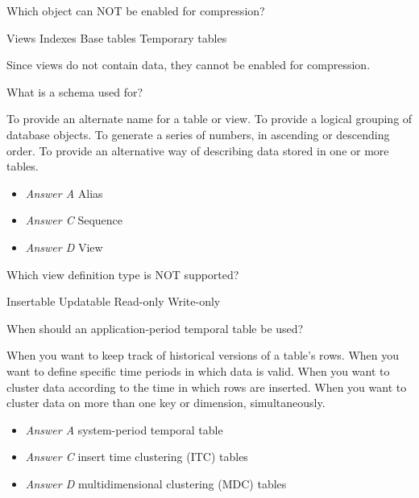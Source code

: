 \documentclass[answers, 11pt]{exam}
\begin{document}
\begin{questions}
\question[1]
Which object can NOT be enabled for compression?
\begin{choices}
	\CorrectChoice Views
	\choice Indexes
	\choice Base tables
	\choice Temporary tables
\end{choices}

\begin{solution}
	Since views do not contain data, they cannot be enabled for compression.
\end{solution}

\question[1]
What is a schema used for?
\begin{choices}
	\choice To provide an alternate name for a table or view.
	\CorrectChoice To provide a logical grouping of database objects.
	\choice To generate a series of numbers, in ascending or descending order.
	\choice To provide an alternative way of describing data stored in one or more tables.
\end{choices}

\begin{solution}
	\begin{itemize}
		\item \textit{Answer A} Alias
		\item \textit{Answer C} Sequence
		\item \textit{Answer D} View
	\end{itemize}
\end{solution}

\question[1]
Which view definition type is NOT supported?
\begin{choices}
	\choice Insertable
	\choice Updatable
	\choice Read-only
	\CorrectChoice Write-only
\end{choices}

\newpage
\question[1]
When should an application-period temporal table be used?
\begin{choices}
	\choice When you want to keep track of historical versions of a table's rows.
	\CorrectChoice When you want to define specific time periods in which data is valid.
	\choice When you want to cluster data according to the time in which rows are inserted.
	\choice When you want to cluster data on more than one key or dimension, simultaneously.
\end{choices}

\begin{solution}
	\begin{itemize}
		\item \textit{Answer A} system-period temporal table
		\item \textit{Answer C} insert time clustering (ITC) tables
		\item \textit{Answer D} multidimensional clustering (MDC) tables 
	\end{itemize}
\end{solution}


\end{questions}
\end{document}
